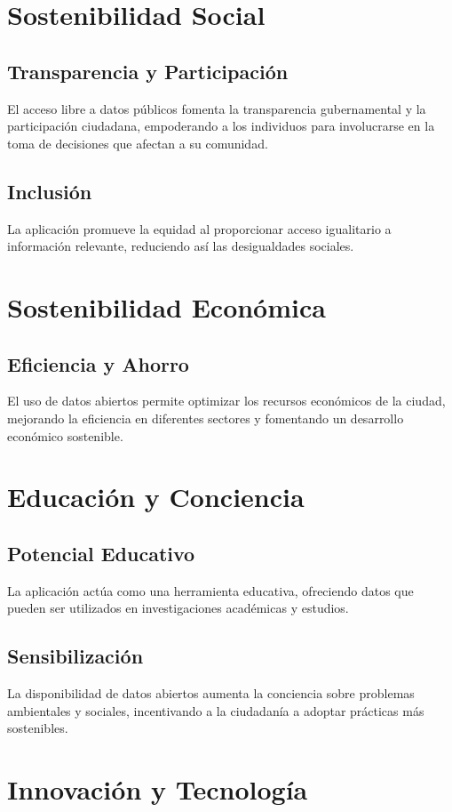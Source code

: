 \section{Sostenibilidad Social}
\subsection{Transparencia y Participación}
El acceso libre a datos públicos fomenta la transparencia gubernamental y la participación ciudadana, empoderando a los individuos para involucrarse en la toma de decisiones que afectan a su comunidad.

\subsection{Inclusión}
La aplicación promueve la equidad al proporcionar acceso igualitario a información relevante, reduciendo así las desigualdades sociales.

\section{Sostenibilidad Económica}
\subsection{Eficiencia y Ahorro}
El uso de datos abiertos permite optimizar los recursos económicos de la ciudad, mejorando la eficiencia en diferentes sectores y fomentando un desarrollo económico sostenible.

\section{Educación y Conciencia}
\subsection{Potencial Educativo}
La aplicación actúa como una herramienta educativa, ofreciendo datos que pueden ser utilizados en investigaciones académicas y estudios.

\subsection{Sensibilización}
La disponibilidad de datos abiertos aumenta la conciencia sobre problemas ambientales y sociales, incentivando a la ciudadanía a adoptar prácticas más sostenibles.

\section{Innovación y Tecnología}
